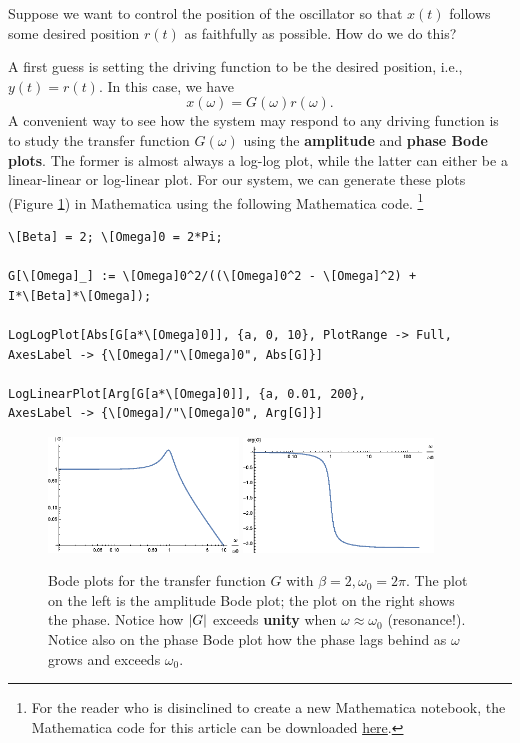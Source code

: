 \documentclass{article}
\theoremstyle{definition}
\begin{document}
\begin{framed}
	\noindent Suppose we want to control the position of the oscillator so that $x(t)$ follows some desired position $r(t)$ as faithfully as possible. How do we do this? 
\end{framed}

A first guess is setting the driving function to be the desired position, i.e., $y(t) = r(t)$. In this case, we have 
\begin{equation*}
x(\omega) = G(\omega) r(\omega).
\end{equation*}
A convenient way to see how the system may respond to any driving function is to study the transfer function $G(\omega)$ using the \textbf{amplitude} and \textbf{phase Bode plots}. The former is almost always a log-log plot, while the latter can either be a linear-linear or log-linear plot. For our system, we can generate these plots (Figure \ref{fig:bode_1}) in Mathematica using the following Mathematica code. \footnote{For the reader who is disinclined to create a new Mathematica notebook, the Mathematica code for this article can be downloaded \href{https://huanqbui.com/MIT PhD/BUI_AtomicPhysics/mathematica/PID_DDSHO.nb}{here}.}

\begin{lstlisting}
\[Beta] = 2; \[Omega]0 = 2*Pi;

G[\[Omega]_] := \[Omega]0^2/((\[Omega]0^2 - \[Omega]^2) + 
I*\[Beta]*\[Omega]);

LogLogPlot[Abs[G[a*\[Omega]0]], {a, 0, 10}, PlotRange -> Full, 
AxesLabel -> {\[Omega]/"\[Omega]0", Abs[G]}]

LogLinearPlot[Arg[G[a*\[Omega]0]], {a, 0.01, 200}, 
AxesLabel -> {\[Omega]/"\[Omega]0", Arg[G]}]
\end{lstlisting}


\begin{figure}[!htb]
	\centering
	\includegraphics[width=0.45\textwidth]{bode_1}
	\quad
	\includegraphics[width=0.45\textwidth]{bode_2}
	\caption{Bode plots for the transfer function $G$ with $\beta = 2,\omega_0 = 2\pi$. The plot on the left is the amplitude Bode plot; the plot on the right shows the phase. Notice how $\abs{G}$ exceeds \textbf{unity} when $\omega \approx \omega_0$ (resonance!). Notice also on the phase Bode plot how the phase lags behind as $\omega$ grows and exceeds $\omega_0$.}%
	\label{fig:bode_1}
\end{figure}
\end{document}
